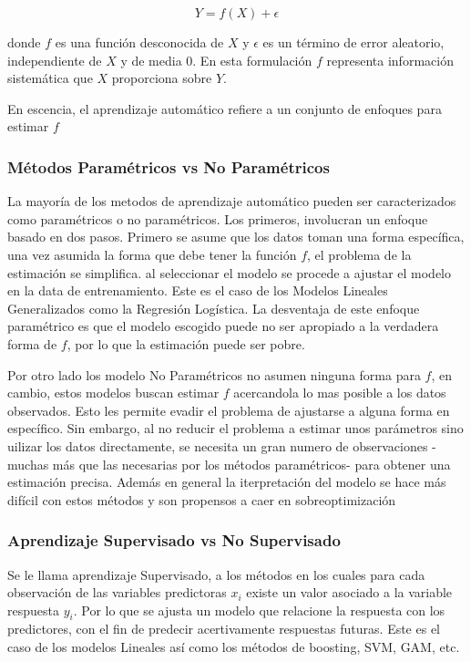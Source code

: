 \documentclass[a4paper,12pt]{Latex/Classes/PhDthesisPSnPDF}
\begin{document}
$$ Y = f(X) + \epsilon $$

donde $f$ es una función desconocida de $X$ y $\epsilon$ es un término de error aleatorio, independiente de $X$ y de media 0. En esta formulación $f$ representa información sistemática que $X$ proporciona sobre $Y$.

En escencia, el aprendizaje automático refiere a un conjunto de enfoques para estimar $f$

\subsubsection{Métodos Paramétricos vs No Paramétricos}

La mayoría de los metodos de aprendizaje automático pueden ser caracterizados como paramétricos o no paramétricos. Los primeros, involucran un enfoque basado en dos pasos. Primero se asume que los datos toman una forma específica, una vez asumida la forma que debe tener la función $f$, el problema de la estimación se simplifica. al seleccionar el modelo se procede a ajustar el modelo en la data de entrenamiento. Este es el caso de los Modelos Lineales Generalizados como la Regresión Logística. La desventaja de este enfoque paramétrico es que el modelo escogido puede no ser apropiado a la verdadera forma de $f$, por lo que la estimación puede ser pobre.

Por otro lado los modelo No Paramétricos no asumen ninguna forma para $f$, en cambio, estos modelos buscan estimar $f$ acercandola lo mas posible a los datos observados. Esto les permite evadir el problema de ajustarse a alguna forma en específico. Sin embargo, al no reducir el problema a estimar unos parámetros sino uilizar los datos directamente, se necesita un gran numero de observaciones -muchas más que las necesarias por los métodos paramétricos- para obtener una estimación precisa. Además en general la iterpretación del modelo se hace más difícil con estos métodos y son propensos a caer en sobreoptimización

\subsubsection{Aprendizaje Supervisado vs No Supervisado}

Se le llama aprendizaje Supervisado, a los métodos en los cuales para cada observación de las variables predictoras $x_{i}$ existe un valor asociado a la variable respuesta $y_{i}$. Por lo que se ajusta un modelo que relacione la respuesta con los predictores, con el fin de predecir acertivamente respuestas futuras. Este es el caso de los modelos Lineales así como los métodos de boosting, SVM, GAM, etc. 
\end{document}
